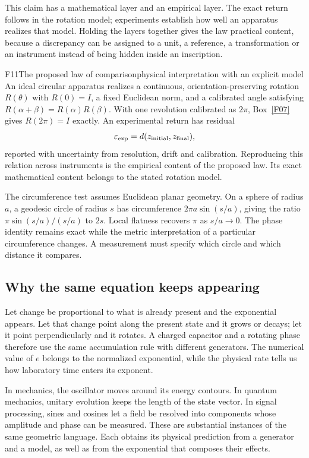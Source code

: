\documentclass[11pt,a4paper]{article}
\begin{document}
This claim has a mathematical layer and an empirical layer. The exact return
follows in the rotation model; experiments establish how well an apparatus
realizes that model. Holding the layers together gives the law practical
content, because a discrepancy can be assigned to a unit, a reference, a
transformation or an instrument instead of being hidden inside an inscription.

\begin{formal}{F11}{The proposed law of comparison}{physical interpretation with an explicit model}
An ideal circular apparatus realizes a continuous, orientation-preserving
rotation $R(\theta)$ with $R(0)=I$, a fixed Euclidean norm, and a calibrated
angle satisfying $R(\alpha+\beta)=R(\alpha)R(\beta)$. With one revolution
calibrated as $2\pi$, Box~\ref{F07} gives $R(2\pi)=I$ exactly.
An experimental return has residual
\begin{equation}
 \varepsilon_{\rm exp}=d(z_{\rm initial},z_{\rm final}),
\end{equation}
reported with uncertainty from resolution, drift and calibration. Reproducing
this relation across instruments is the empirical content of the proposed
law. Its exact mathematical content belongs to the stated rotation model.

The circumference test assumes Euclidean planar geometry. On a sphere of
radius $a$, a geodesic circle of radius $s$ has circumference
$2\pi a\sin(s/a)$, giving the ratio
$\pi\sin(s/a)/(s/a)$ to $2s$. Local flatness recovers $\pi$ as $s/a\to0$.
The phase identity remains exact while the metric interpretation of a
particular circumference changes. A measurement must specify which circle and
which distance it compares.
\end{formal}

\subsection{Why the same equation keeps appearing}
Let change be proportional to what is already present and the exponential
appears. Let that change point along the present state and it grows or
decays; let it point perpendicularly and it rotates. A charged capacitor and
a rotating phase therefore use the same accumulation rule with different
generators. The numerical value of $e$ belongs to the normalized exponential,
while the physical rate tells us how laboratory time enters its exponent.

In mechanics, the oscillator moves around its energy contours. In quantum
mechanics, unitary evolution keeps the length of the state vector. In signal
processing, sines and cosines let a field be resolved into components whose
amplitude and phase can be measured. These are substantial instances of the
same geometric language. Each obtains its physical prediction from a generator
and a model, as well as from the exponential that composes their effects.
\end{document}
